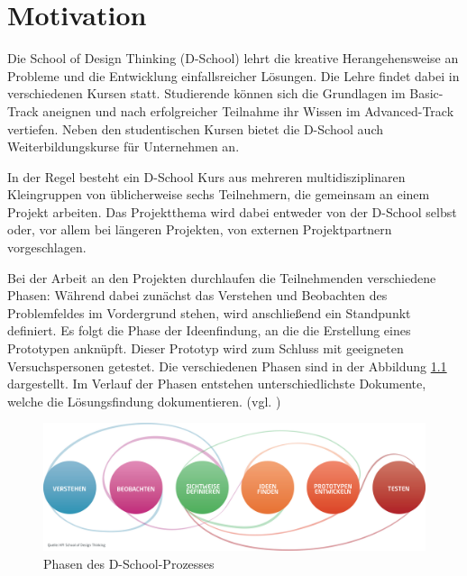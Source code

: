 \chapter{Motivation}
\label{chap:Einleitung}
Die School of Design Thinking (D-School) lehrt die kreative Herangehensweise an Probleme und die Entwicklung einfallsreicher Lösungen. Die Lehre findet dabei in verschiedenen Kursen statt. Studierende können sich die Grundlagen im \gls{Basic-Track} aneignen und nach erfolgreicher Teilnahme ihr Wissen im  \gls{Advanced-Track} vertiefen. Neben den studentischen Kursen bietet die D-School auch Weiterbildungskurse für Unternehmen an.

In der Regel besteht ein D-School Kurs aus mehreren multidisziplinaren Kleingruppen von üblicherweise sechs Teilnehmern, die gemeinsam an einem Projekt arbeiten. Das Projektthema wird dabei entweder von der D-School selbst oder, vor allem bei längeren Projekten, von externen Projektpartnern vorgeschlagen. 

Bei der Arbeit an den Projekten durchlaufen die Teilnehmenden verschiedene Phasen: Während dabei zunächst das Verstehen und Beobachten des Problemfeldes im Vordergrund stehen, wird anschließend ein Standpunkt definiert. Es folgt die Phase der Ideenfindung, an die die Erstellung eines Prototypen anknüpft. Dieser Prototyp wird zum Schluss mit geeigneten Versuchspersonen getestet. Die verschiedenen Phasen sind in der Abbildung \ref{fig:dschool-prozess} dargestellt. Im Verlauf der Phasen entstehen unterschiedlichste Dokumente, welche die Lösungsfindung dokumentieren. (vgl. \cite{design-thinking})

\begin{figure}[h]  
  \centering     
  \includegraphics[width=1.0\textwidth]{img/dschool_prozess.jpg}  
   \caption{Phasen des D-School-Prozesses\protect\footnotemark}
  \label{fig:dschool-prozess} 
\end{figure}

